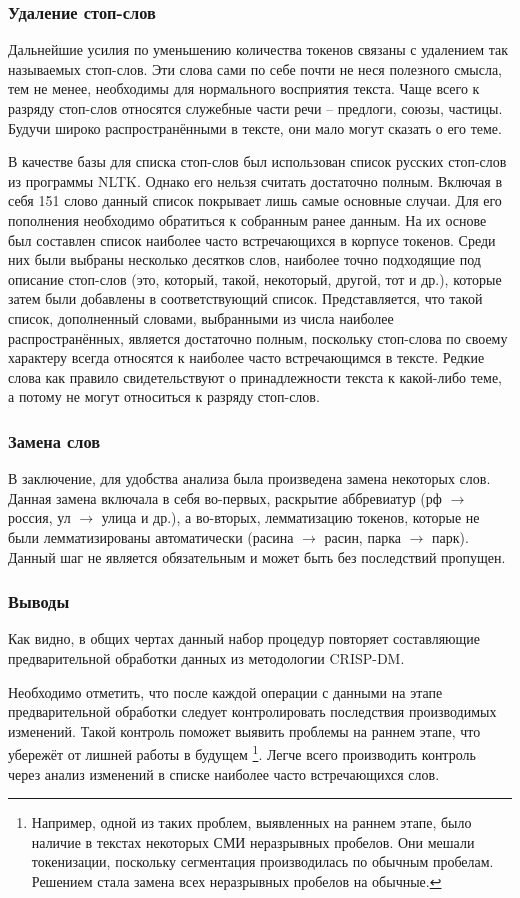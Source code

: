 \subsubsection{Удаление стоп-слов}
Дальнейшие усилия по уменьшению количества токенов связаны с удалением так называемых стоп-слов. Эти слова сами по себе почти не неся полезного смысла, тем не менее, необходимы для нормального восприятия текста. Чаще всего к разряду стоп-слов относятся служебные части речи -- предлоги, союзы, частицы. Будучи широко распространёнными в тексте, они мало могут сказать о его теме.

В качестве базы для списка стоп-слов был использован список русских стоп-слов из программы NLTK. Однако его нельзя считать достаточно полным. Включая в себя 151 слово данный список покрывает лишь самые основные случаи. Для его пополнения необходимо обратиться к собранным ранее данным. На их основе был составлен список наиболее часто встречающихся в корпусе токенов. Среди них были выбраны несколько десятков слов, наиболее точно подходящие под описание стоп-слов (это, который, такой, некоторый, другой, тот и др.), которые затем были добавлены в соответствующий список. Представляется, что такой список, дополненный словами, выбранными из числа наиболее распространённых, является достаточно полным, поскольку стоп-слова по своему характеру всегда относятся к наиболее часто встречающимся в тексте. Редкие слова как правило свидетельствуют о принадлежности текста к какой-либо теме, а потому не могут относиться к разряду стоп-слов.

\subsubsection{Замена слов}
В заключение, для удобства анализа была произведена замена некоторых слов. Данная замена включала в себя во-первых, раскрытие аббревиатур (рф $\to$ россия, ул $\to$ улица и др.), а во-вторых, лемматизацию токенов, которые не были лемматизированы автоматически (расина $\to$ расин, парка $\to$ парк). Данный шаг не является обязательным и может быть без последствий пропущен.

\subsubsection{Выводы}
Как видно, в общих чертах данный набор процедур повторяет составляющие предварительной обработки данных из методологии CRISP-DM.

Необходимо отметить, что после каждой операции с данными на этапе предварительной обработки следует контролировать последствия производимых изменений. Такой контроль поможет выявить проблемы на раннем этапе, что убережёт от лишней работы в будущем \footnote{Например, одной из таких проблем, выявленных на раннем этапе, было наличие в текстах некоторых СМИ неразрывных пробелов. Они мешали токенизации, поскольку сегментация производилась по обычным пробелам. Решением стала замена всех неразрывных пробелов на обычные.}. Легче всего производить контроль через анализ изменений в списке наиболее часто встречающихся слов.

